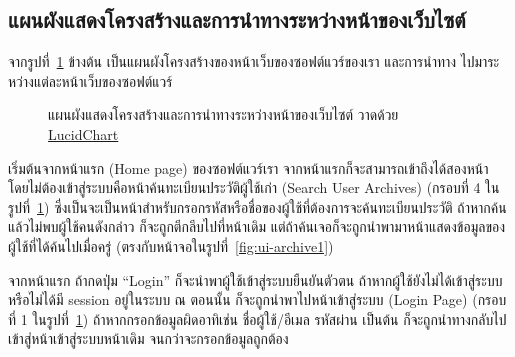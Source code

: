 \documentclass[12pt,one side,openright,a4paper]{cpe-thesis-th}
\newcommand{\thaijustify}[1]{%
  \par\hspace{30pt}\justifying
  #1
}
\begin{document}
    \subsection{แผนผังแสดงโครงสร้างและการนำทางระหว่างหน้าของเว็บไซต์}
        \thaijustify{
            จากรูปที่~\ref{fig:nav-map} ข้างต้น เป็นแผนผังโครงสร้างของหน้าเว็บของซอฟต์แวร์ของเรา และการนำทาง ไปมาระหว่างแต่ละหน้าเว็บของซอฟต์แวร์
        }
        \begin{figure}[H]
            \centering
            \caption[ภาพแผนผังการสัญจรและนำทางระหว่างหน้าของเว็บไซต์]{แผนผังแสดงโครงสร้างและการนำทางระหว่างหน้าของเว็บไซต์ วาดด้วย \href{https://lucid.app/}{LucidChart}}
            \label{fig:nav-map}
        \end{figure}
        \thaijustify{
            เริ่มต้นจากหน้าแรก (Home page) ของซอฟต์แวร์เรา จากหน้าแรกก็จะสามารถเข้าถึงได้สองหน้า โดยไม่ต้องเข้าสู่ระบบคือหน้าค้นทะเบียนประวัติผู้ใช้เก่า (Search User Archives) (กรอบที่ 4 ในรูปที่~\ref{fig:nav-map}) ซึ่งเป็นจะเป็นหน้าสำหรับกรอกรหัสหรือชื่อของผู้ใช้ที่ต้องการจะค้นทะเบียนประวัติ ถ้าหากค้นแล้วไม่พบผู้ใช้คนดังกล่าว ก็จะถูกตีกลีบไปที่หน้าเดิม แต่ถ้าค้นเจอก็จะถูกนำพามาหน้าแสดงข้อมูลของผู้ใช้ที่ได้ค้นไปเมื่อครู่ (ตรงกับหน้าจอในรูปที่~\ref{fig:ui-archive1})
        }
        \thaijustify{
            จากหน้าแรก ถ้ากดปุ่ม “Login” ก็จะนำพาผู้ใช้เข้าสู่ระบบยืนยันตัวตน ถ้าหากผู้ใช้ยังไม่ได้เข้าสู่ระบบหรือไม่ได้มี session อยู่ในระบบ ณ ตอนนั้น ก็จะถูกนำพาไปหน้าเข้าสู่ระบบ (Login Page) (กรอบที่ 1 ในรูปที่~\ref{fig:nav-map}) ถ้าหากกรอกข้อมูลผิดอาทิเช่น ชื่อผู้ใช้/อีเมล รหัสผ่าน เป็นต้น ก็จะถูกนำทางกลับไปเข้าสู่หน้าเข้าสู่ระบบหน้าเดิม จนกว่าจะกรอกข้อมูลถูกต้อง
        }
\end{document}
